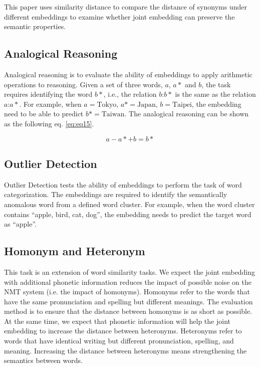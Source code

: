 This paper uses similarity distance to compare the distance of synonyms under different embeddings to examine whether joint embedding can preserve the semantic properties.

\subsection{Analogical Reasoning} \label{sec:analogy}

Analogical reasoning is to evaluate the ability of embeddings to apply arithmetic operations to reasoning. Given a set of three words, $a$, $a*$ and $b$, the task requires identifying the word $b*$, i.e., the relation $b$:$b*$ is the same as the relation $a$:$a*$. For example, when $a=\text{Tokyo}$, $a*=\text{Japan}$, $b=\text{Taipei}$, the embedding need to be able to predict $b*=\text{Taiwan}$. The analogical reasoning can be shown as the following eq. \ref{eq:eq15}.

\begin{equation}
    a - a* + b = b* \label{eq:eq15}
\end{equation}

\subsection{Outlier Detection} \label{sec:outlier}

Outlier Detection tests the ability of embeddings to perform the task of word categorization. The embeddings are required to identify the semantically anomalous word from a defined word cluster. For example, when the word cluster contains ``apple, bird, cat, dog'', the embedding needs to predict the target word as ``apple''.

\subsection{Homonym and Heteronym} \label{sec:homonym_heteronym}

This task is an extension of word similarity tasks. We expect the joint embedding with additional phonetic information reduces the impact of possible noise on the NMT system (i.e. the impact of homonyms). Homonyms refer to the words that have the same pronunciation and spelling but different meanings. The evaluation method is to ensure that the distance between homonyms is as short as possible. At the same time, we expect that phonetic information will help the joint embedding to increase the distance between heteronyms. Heteronyms refer to words that have identical writing but different pronunciation, spelling, and meaning. Increasing the distance between heteronyms means strengthening the semantics between words.
